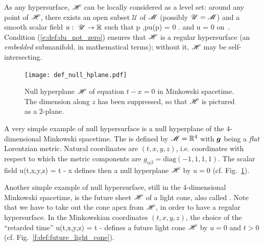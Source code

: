 As any hypersurface, $\mathscr{H}$ can be locally considered as a level set:
around any point of $\mathscr{H}$, there exists an open subset $\mathscr{U}$
of $\mathscr{M}$ (possibly  $\mathscr{U} = \mathscr{M}$) and
a smooth scalar field $u:\ \mathscr{U} \rightarrow \mathbb{R}$ such that
\be \label{e:def:Hor_u_zero}
    \forall p \in {},\quad p\in \Hor \iff u(p) = 0 .
\ee
and
\be \label{e:def:du_not_zero}
    \wnab u \not = 0 \quad \mbox{on}\ \Hor .
\ee
Condition (\ref{e:def:du_not_zero}) ensures that $\mathscr{H}$ is a regular
hypersurface (an \emph{embedded} submanifold, in mathematical terms); without it, $\mathscr{H}$ may be
self-intersecting.

\begin{figure}
\centerline{\texttt{[image: def\_null\_hplane.pdf]}}
\caption[]{\label{f:def:null_hplane} \footnotesize
Null hyperplane $\mathscr{H}$ of equation $t-x=0$ in Minkowski spacetime.
The dimension along $z$ has been suppressed, so that $\mathscr{H}$ is pictured as a
2-plane.}
\end{figure}


\begin{example} \label{x:def:null_hyp}
A very simple example of null hypersurface is a null hyperplane of
the 4-dimensional Minkowski spacetime. The  is defined by $\mathscr{M}=\mathbb{R}^4$ with $\bm{g}$ being a \emph{flat} Lorentzian
metric. Natural coordinates are  $(t,x,y,z)$,
i.e. coordinates with
respect to which the metric components are $g_{\alpha\beta} = \mathrm{diag}(-1,1,1,1)$. The scalar field
\be \label{e:def:null_plane_u}
    u(t,x,y,z) = t - x
\ee
defines then a null hyperplane $\mathscr{H}$ by $u=0$ (cf. Fig.~\ref{f:def:null_hplane}).
\end{example}

\begin{example} \label{x:def:light_cone}
Another simple example of null hypersurface, still in the 4-dimensional Minkowski spacetime,
is the future sheet $\mathscr{H}$ of a light cone, also
called . Note that we have
to take out the cone apex from $\mathscr{H}$, in order to have a regular hypersurface.
In the  Minkowskian coordinates $(t,x,y,z)$, the choice of the
``retarded time''
\be \label{e:def:light_cone_u}
    u(t,x,y,z) = t - 
\ee
defines a future light cone $\mathscr{H}$ by $u=0$ and $t>0$ (cf.
Fig.~\ref{f:def:future_light_cone}).
\end{example}

